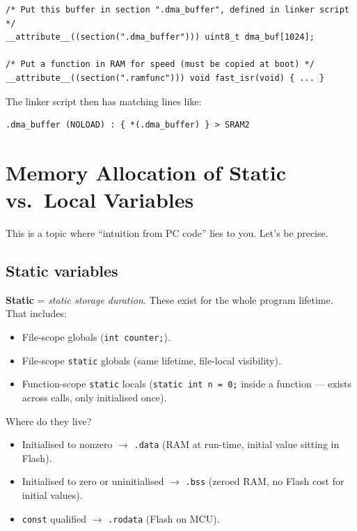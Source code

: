\documentclass[11pt,a4paper]{article}
\begin{document}
\begin{lstlisting}[style=C, caption={Placing variables in custom sections}]
/* Put this buffer in section ".dma_buffer", defined in linker script */
__attribute__((section(".dma_buffer"))) uint8_t dma_buf[1024];

/* Put a function in RAM for speed (must be copied at boot) */
__attribute__((section(".ramfunc"))) void fast_isr(void) { ... }
\end{lstlisting}

The linker script then has matching lines like:
\begin{lstlisting}[style=shell]
.dma_buffer (NOLOAD) : { *(.dma_buffer) } > SRAM2
\end{lstlisting}

\section{Memory Allocation of Static vs.\ Local Variables}

This is a topic where ``intuition from PC code'' lies to you. Let's be precise.

\subsection{Static variables}

\textbf{Static} = \emph{static storage duration}. These exist for the whole
program lifetime. That includes:
\begin{itemize}[leftmargin=*]
    \item File-scope globals (\texttt{int counter;}).
    \item File-scope \texttt{static} globals (same lifetime, file-local visibility).
    \item Function-scope \texttt{static} locals (\texttt{static int n = 0;}
    inside a function --- exists across calls, only initialised once).
\end{itemize}

Where do they live?
\begin{itemize}[leftmargin=*]
    \item Initialised to nonzero $\rightarrow$ \texttt{.data} (RAM at run-time,
    initial value sitting in Flash).
    \item Initialised to zero or uninitialised $\rightarrow$ \texttt{.bss}
    (zeroed RAM, no Flash cost for initial values).
    \item \texttt{const} qualified $\rightarrow$ \texttt{.rodata} (Flash on MCU).
\end{itemize}
\end{document}
